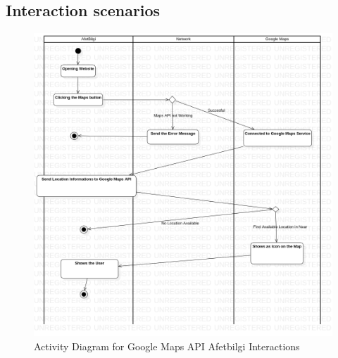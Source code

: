 \subsection{Interaction scenarios}

\begin{figure}[H]
    \includegraphics[scale = 0.5]{assets/Activity DiagramMaps.png}
    \caption[Activity Diagram for Google Maps API Afetbilgi Interactions]{Activity Diagram for Google Maps API Afetbilgi Interactions}
\end{figure}

